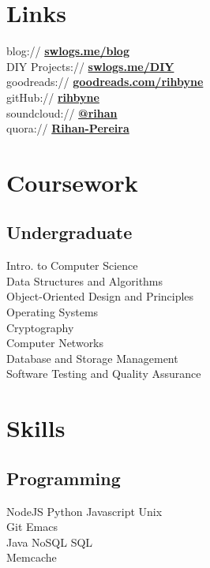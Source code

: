 \documentclass[]{deedy-resume-openfont}
\begin{document}
\begin{minipage}[t]{0.33\textwidth}
\section{Links}
blog:// \href{http://swlogs.me/blog}{\bf swlogs.me/blog} \\
DIY Projects:// \href{http://swlogs.me/DIY}{\bf swlogs.me/DIY} \\
goodreads://  \href{https://goodreads.com/rihbyne}{\bf goodreads.com/rihbyne} \\ 
gitHub:// \href{https://github.com/rihbyne}{\bf rihbyne} \\
soundcloud:// \href{http://www.soundcloud.com/rihbyne}{\bf @rihan} \\
quora://  \href{https://www.quora.com/Rihan-Pereira}{\bf Rihan-Pereira}


\section{Coursework}
\subsection{Undergraduate}
Intro. to Computer Science\\
Data Structures and Algorithms\\ 
Object-Oriented Design and Principles\\
Operating Systems\\
Cryptography \\
Computer Networks \\
Database and Storage Management \\
Software Testing and Quality Assurance
\sectionsep


\section{Skills}
\subsection{Programming}
NodeJS \textbullet{} Python \textbullet{} Javascript \textbullet{} Unix \\
Git \textbullet{} Emacs \\
Java \textbullet{} NoSQL \textbullet{} SQL \\
Memcache 
\sectionsep


\end{minipage}
\end{document}
